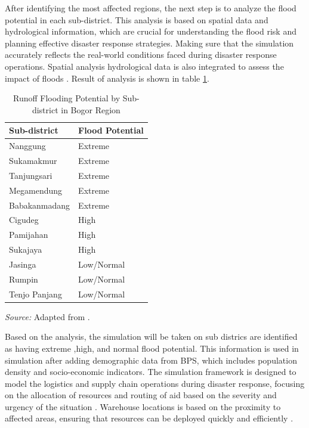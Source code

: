 \documentclass[conference,final,a4paper,twoside,10pt]{IEEEtran}
\begin{document}
After identifying the most affected regions, the next step is to analyze the flood potential in each sub-district. This analysis is based on spatial data and hydrological information, which are crucial for understanding the flood risk and planning effective disaster response strategies.
Making sure that the simulation accurately reflects the real-world conditions faced during disaster response operations. Spatial analysis hydrological data is also integrated to assess the impact of floods \cite{alkaesi2021spatial}. Result of analysis is shown in table \ref{tab:analysis}.
\begin{table}[H]
\caption{Runoff Flooding Potential by Sub-district in Bogor Region}
\begin{center}
\begin{tabular}{|m{2.5cm}|m{2cm}|}
\hline
\textbf{Sub-district} & \textbf{Flood Potential} \\
\hline
Nanggung & Extreme \\
\hline Sukamakmur & Extreme \\
\hline Tanjungsari & Extreme \\
\hline Megamendung & Extreme  \\
\hline Babakanmadang & Extreme  \\
\hline
Cigudeg & High \\
\hline Pamijahan & High  \\
\hline Sukajaya & High  \\
\hline
Jasinga & Low/Normal  \\
\hline Rumpin & Low/Normal  \\
\hline Tenjo Panjang & Low/Normal  \\
\hline
\end{tabular}
\vspace{0.2cm}

\footnotesize{\textit{Source:} Adapted from \cite{alkaesi2021spatial}.}
\label{tab:analysis}
\end{center}
\end{table}

Based on the analysis, the simulation will be taken on sub districs are identified as having extreme ,high, and normal flood potential. This information is used in simulation after adding demographic data from BPS, which includes population density and socio-economic indicators. The simulation framework is designed to model the logistics and supply chain operations during disaster response, focusing on the allocation of resources and routing of aid based on the severity and urgency of the situation \cite{park2021architectural}. Warehouse locations is based on the proximity to affected areas, ensuring that resources can be deployed quickly and efficiently \cite{halawa2020introduction}.  
\end{document}

